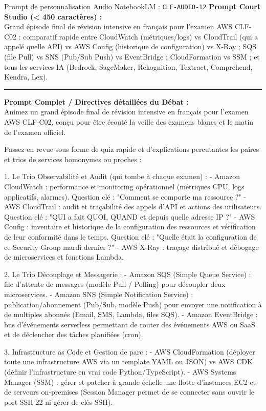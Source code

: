 \documentclass[11pt,a4paper]{article}
\begin{document}
\begin{promptbox}{Prompt de personnalisation Audio NotebookLM : \texttt{CLF-AUDIO-12}}
\textbf{Prompt Court Studio (< 450 caractères) :}\\
Grand épisode final de révision intensive en français pour l'examen AWS CLF-C02 : comparatif rapide entre CloudWatch (métriques/logs) vs CloudTrail (qui a appelé quelle API) vs AWS Config (historique de configuration) vs X-Ray ; SQS (file Pull) vs SNS (Pub/Sub Push) vs EventBridge ; CloudFormation vs SSM ; et tous les services IA (Bedrock, SageMaker, Rekognition, Textract, Comprehend, Kendra, Lex).

\medskip\hrule\medskip
\textbf{Prompt Complet / Directives détaillées du Débat :}\\
Animez un grand épisode final de révision intensive en français pour l'examen AWS CLF-C02, conçu pour être écouté la veille des examens blancs et le matin de l'examen officiel.

Passez en revue sous forme de quiz rapide et d'explications percutantes les paires et trios de services homonymes ou proches :

1. Le Trio Observabilité et Audit (qui tombe à chaque examen) :
- Amazon CloudWatch : performance et monitoring opérationnel (métriques CPU, logs applicatifs, alarmes). Question clé : "Comment se comporte ma ressource ?"
- AWS CloudTrail : audit et traçabilité des appels d'API et actions des utilisateurs. Question clé : "QUI a fait QUOI, QUAND et depuis quelle adresse IP ?"
- AWS Config : inventaire et historique de la configuration des ressources et vérification de leur conformité dans le temps. Question clé : "Quelle était la configuration de ce Security Group mardi dernier ?"
- AWS X-Ray : traçage distribué et débogage de microservices et fonctions Lambda.

2. Le Trio Découplage et Messagerie :
- Amazon SQS (Simple Queue Service) : file d'attente de messages (modèle Pull / Polling) pour découpler deux microservices.
- Amazon SNS (Simple Notification Service) : publication/abonnement (Pub/Sub, modèle Push) pour envoyer une notification à de multiples abonnés (Email, SMS, Lambda, files SQS).
- Amazon EventBridge : bus d'événements serverless permettant de router des événements AWS ou SaaS et de déclencher des tâches planifiées (cron).

3. Infrastructure as Code et Gestion de parc :
- AWS CloudFormation (déployer toute une infrastructure AWS via un template YAML ou JSON) vs AWS CDK (définir l'infrastructure en vrai code Python/TypeScript).
- AWS Systems Manager (SSM) : gérer et patcher à grande échelle une flotte d'instances EC2 et de serveurs on-premises (Session Manager permet de se connecter sans ouvrir le port SSH 22 ni gérer de clés SSH).


\end{promptbox}
\end{document}
